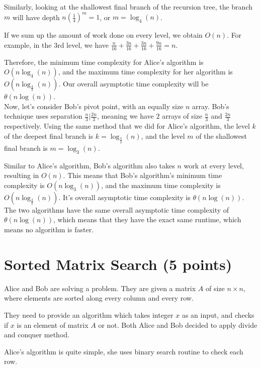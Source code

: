 \documentclass[letter,11pt]{article}
\begin{document}
Similarly, looking at the shallowest final branch of the recursion tree, the branch $m$ will have depth $n(\frac{1}{4})^m = 1$, or $m = \log_{4}(n)$.

If we sum up the amount of work done on every level, we obtain $O(n)$. For example, in the 3rd level, we have $\frac{n}{16} + \frac{3n}{16} + \frac{3n}{16} + \frac{9n}{16} = n$.

Therefore, the minimum time complexity for Alice's algorithm is $O(n\log_{4}(n))$, and the maximum time complexity for her algorithm is $O(n\log_{\frac{4}{3}}(n))$. Our overall asymptotic time complexity will be $\theta(n\log(n))$. \\

Now, let's consider Bob's pivot point, with an equally size $n$ array. Bob's technique uses separation $\frac{n}{3} | \frac{2n}{3}$, meaning we have $2$ arrays of size $\frac{n}{3}$ and $\frac{2n}{3}$ respectively. Using the same method that we did for Alice's algorithm, the level $k$ of the deepest final branch is $k = \log_{\frac{3}{2}}(n)$, and the level $m$ of the shallowest final branch is $m = \log_3(n)$.

Similar to Alice's algorithm, Bob's algorithm also takes $n$ work at every level, resulting in $O(n)$. This means that Bob's algorithm's minimum time complexity is $O(n\log_3(n))$, and the maximum time complexity is $O(n\log_{\frac{3}{2}}(n))$. It's overall asymptotic time complexity is $\theta(n\log(n))$. \\

The two algorithms have the same overall asymptotic time complexity of $\theta(n\log(n))$, which means that they have the exact same runtime, which means no algorithm is faster.



\section{Sorted Matrix Search (5 points)}

Alice and Bob are solving a problem. They are given a matrix $A$ of size $n\times n$, where elements are sorted along every column and every row. 


They need to provide an algorithm which takes integer $x$ as an input, and checks if $x$ is an element of matrix $A$ or not. Both Alice and Bob decided to apply divide and conquer method.

Alice's algorithm is quite simple, she uses binary search routine to check each row.
\end{document}
